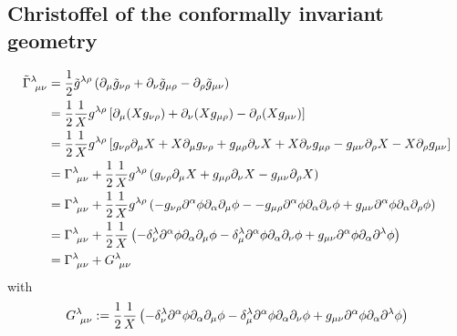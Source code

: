 \subsection{Christoffel of the conformally invariant geometry}
\begin{align}
  \tilde{\Gamma }^\lambda_{~\mu\nu }&=\frac{1}{2}\tilde{g}^{\lambda\rho }\left(\partial_\mu \tilde{g}_{\nu\rho}+\partial_\nu \tilde{g}_{\mu\rho }-\partial_\rho\tilde{g}_{\mu\nu }\right)\\
  &=\frac{1}{2}\frac{1}{X}g^{\lambda\rho }\left[\partial_\mu (Xg_{\nu\rho })+\partial_\nu  (Xg_{\mu \rho })-\partial_\rho  (Xg_{\mu\nu  })\right]\\
  &=\frac{1}{2}\frac{1}{X}g^{\lambda\rho }\left[g_{\nu\rho }\partial_\mu X+X\partial_\mu g_{\nu\rho }+g_{\mu \rho }\partial_\nu  X+X\partial_\nu  g_{\mu \rho }-g_{\mu\nu }\partial_\rho  X-X\partial_\rho  g_{\mu\nu  }\right]\\
  &=\Gamma^{\lambda}_{~\mu\nu }+\frac{1}{2}\frac{1}{X}g^{\lambda\rho }\left(g_{\nu\rho }\partial_\mu X+g_{\mu \rho }\partial_\nu  X-g_{\mu\nu  }\partial_\rho  X\right)\\
  &=\Gamma^{\lambda}_{~\mu\nu }+\frac{1}{2}\frac{1}{X}g^{\lambda\rho }\left(-g_{\nu\rho }\partial^\alpha\phi\partial_\alpha\partial_\mu\phi --g_{\mu \rho }\partial^\alpha\phi\partial_\alpha\partial_\nu \phi +g_{\mu\nu  }\partial^\alpha\phi\partial_\alpha\partial_\rho \phi \right)\\
  &=\Gamma^{\lambda}_{~\mu\nu }+\frac{1}{2}\frac{1}{X}\left(-\delta^\lambda_\nu \partial^\alpha\phi\partial_\alpha\partial_\mu\phi-\delta^\lambda_\mu  \partial^\alpha\phi\partial_\alpha\partial_\nu \phi  +g_{\mu\nu }\partial^\alpha\phi\partial_\alpha\partial^\lambda\phi \right)\\
  &=\Gamma^{\lambda}_{~\mu\nu }+G^{\lambda}_{~\mu\nu }
\end{align}
with
\begin{equation}
  G^{\lambda}_{~\mu\nu }:=\frac{1}{2}\frac{1}{X}\left(-\delta^\lambda_\nu \partial^\alpha\phi\partial_\alpha\partial_\mu\phi-\delta^\lambda_\mu  \partial^\alpha\phi\partial_\alpha\partial_\nu \phi  +g_{\mu\nu }\partial^\alpha\phi\partial_\alpha\partial^\lambda\phi \right)
\end{equation}





